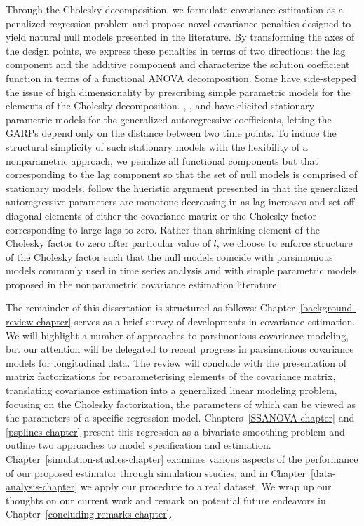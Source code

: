 \bigskip


Through the Cholesky decomposition, we formulate covariance estimation as a penalized regression problem and propose novel covariance penalties designed to yield natural null models presented in the literature. By transforming the axes of the design points, we express these penalties in terms of two directions: the lag component and the additive component and characterize the solution coefficient function in terms of a functional ANOVA decomposition. Some have side-stepped the issue of high dimensionality by prescribing simple parametric models for the elements of the Cholesky decomposition.  \cite{chen2011semiparametric}, \cite{pourahmadi1999joint}, and \cite{pourahmadi2002dynamic} have elicited stationary parametric models for the generalized autoregressive coefficients, letting the GARPs depend only on the distance between two time points. To induce the structural simplicity of such stationary models with the flexibility of a nonparametric approach, we penalize all functional components but that corresponding to the lag component so that the set of null models is comprised of stationary models.  \cite{huang2007estimation} follow the hueristic argument presented in \cite{pourahmadi1999joint} that the generalized autoregressive parameters are monotone decreasing in as lag increases and set off-diagonal elements of either the covariance matrix or the Cholesky factor corresponding to large lags to zero. Rather than shrinking element of the Cholesky factor to zero after particular value of $l$, we choose to enforce structure of the Cholesky factor such that the null models coincide with parsimonious models commonly used in time series analysis and with simple parametric models proposed in the nonparametric covariance estimation literature.

\bigskip

The remainder of this dissertation is structured as follows: Chapter~\ref{background-review-chapter} serves as a brief survey of developments in covariance estimation.  We will highlight a number of approaches to parsimonious covariance modeling, but our attention will be delegated to recent progress in parsimonious covariance models for longitudinal data. The review will conclude with the presentation of matrix factorizations for reparameterising elements of the covariance matrix, translating covariance estimation into a generalized linear modeling problem, focusing on the Cholesky factorization, the parameters of which can be viewed as the parameters of a specific regression model. Chapters~\ref{SSANOVA-chapter} and \ref{psplines-chapter} present this regression as a bivariate smoothing problem and outline two approaches to model specification and estimation. Chapter~\ref{simulation-studies-chapter} examines various aspects of the performance of our proposed estimator through simulation studies, and in Chapter~\ref{data-analysis-chapter} we apply our procedure to a real dataset. We wrap up our thoughts on our current work and remark on potential future endeavors in Chapter~\ref{concluding-remarks-chapter}. 

